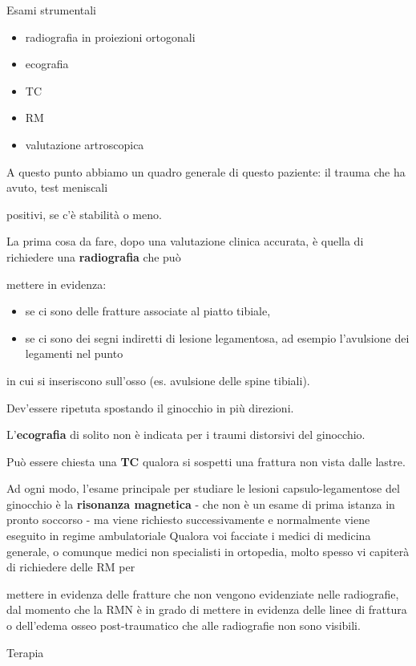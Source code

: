 \documentclass[]{article}
\begin{document}
Esami strumentali

\begin{itemize}
\item
  radiografia in proiezioni ortogonali
\item
  ecografia
\item
  TC
\item
  RM
\item
  valutazione artroscopica
\end{itemize}

A questo punto abbiamo un quadro generale di questo paziente: il trauma
che ha avuto, test meniscali

positivi, se c'è stabilità o meno.

La prima cosa da fare, dopo una valutazione clinica accurata, è quella
di richiedere una \textbf{radiografia} che può

mettere in evidenza:

\begin{itemize}
\item
  se ci sono delle fratture associate al piatto tibiale,
\item
  se ci sono dei segni indiretti di lesione legamentosa, ad esempio
  l'avulsione dei legamenti nel punto
\end{itemize}

in cui si inseriscono sull'osso (es. avulsione delle spine tibiali).

Dev'essere ripetuta spostando il ginocchio in più direzioni.

L'\textbf{ecografia} di solito non è indicata per i traumi distorsivi
del ginocchio.

Può essere chiesta una \textbf{TC} qualora si sospetti una frattura non
vista dalle lastre.

Ad ogni modo, l'esame principale per studiare le lesioni
capsulo-legamentose del ginocchio è la \textbf{risonanza magnetica} -
che non è un esame di prima istanza in pronto soccorso - ma viene
richiesto successivamente e normalmente viene eseguito in regime
ambulatoriale Qualora voi facciate i medici di medicina generale, o
comunque medici non specialisti in ortopedia, molto spesso vi capiterà
di richiedere delle RM per

mettere in evidenza delle fratture che non vengono evidenziate nelle
radiografie, dal momento che la RMN è in grado di mettere in evidenza
delle linee di frattura o dell'edema osseo post-traumatico che alle
radiografie non sono visibili.

Terapia
\end{document}
